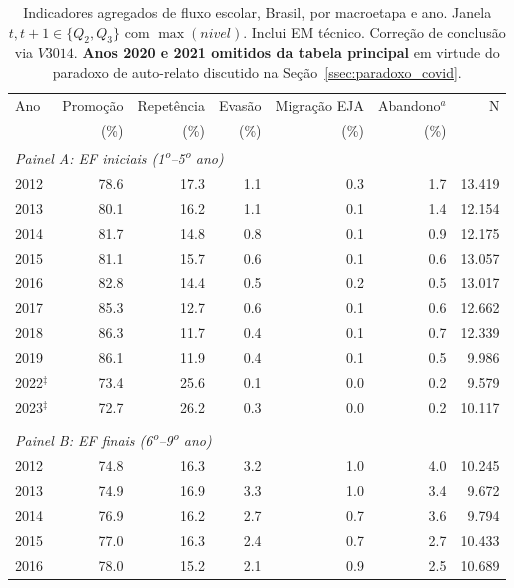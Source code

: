\begin{table}[htbp]
\centering
\caption{Indicadores agregados de fluxo escolar, Brasil, por macroetapa e ano. Janela $t,t{+}1 \in \{Q_2,Q_3\}$ com $\max(\textit{nivel})$. Inclui EM t\'ecnico. Corre\c{c}\~ao de conclus\~ao via $V3014$. \textbf{Anos 2020 e 2021 omitidos da tabela principal} em virtude do paradoxo de auto-relato discutido na Se\c{c}\~ao~\ref{ssec:paradoxo_covid}.}
\label{tab:t1_brasil}
\begin{threeparttable}
\small
\begin{tabular}{lrrrrrr}
\toprule
Ano & Promo\c{c}\~ao & Repet\^encia & Evas\~ao & Migra\c{c}\~ao EJA & Abandono$^{a}$ & N \\
    & (\%)            & (\%)        & (\%)     & (\%)               & (\%)            &   \\
\midrule
\multicolumn{7}{l}{\textit{Painel A: EF iniciais (1\textsuperscript{o}--5\textsuperscript{o} ano)}} \\
\midrule
2012 & 78.6 & 17.3 & 1.1 & 0.3 & 1.7 & 13.419 \\
2013 & 80.1 & 16.2 & 1.1 & 0.1 & 1.4 & 12.154 \\
2014 & 81.7 & 14.8 & 0.8 & 0.1 & 0.9 & 12.175 \\
2015 & 81.1 & 15.7 & 0.6 & 0.1 & 0.6 & 13.057 \\
2016 & 82.8 & 14.4 & 0.5 & 0.2 & 0.5 & 13.017 \\
2017 & 85.3 & 12.7 & 0.6 & 0.1 & 0.6 & 12.662 \\
2018 & 86.3 & 11.7 & 0.4 & 0.1 & 0.7 & 12.339 \\
2019 & 86.1 & 11.9 & 0.4 & 0.1 & 0.5 & 9.986 \\
2022$^{\ddagger}$ & 73.4 & 25.6 & 0.1 & 0.0 & 0.2 & 9.579 \\
2023$^{\ddagger}$ & 72.7 & 26.2 & 0.3 & 0.0 & 0.2 & 10.117 \\
\\[0.3em]
\multicolumn{7}{l}{\textit{Painel B: EF finais (6\textsuperscript{o}--9\textsuperscript{o} ano)}} \\
\midrule
2012 & 74.8 & 16.3 & 3.2 & 1.0 & 4.0 & 10.245 \\
2013 & 74.9 & 16.9 & 3.3 & 1.0 & 3.4 & 9.672 \\
2014 & 76.9 & 16.2 & 2.7 & 0.7 & 3.6 & 9.794 \\
2015 & 77.0 & 16.3 & 2.4 & 0.7 & 2.7 & 10.433 \\
2016 & 78.0 & 15.2 & 2.1 & 0.9 & 2.5 & 10.689 \\

\end{tabular}
\end{threeparttable}
\end{table}
